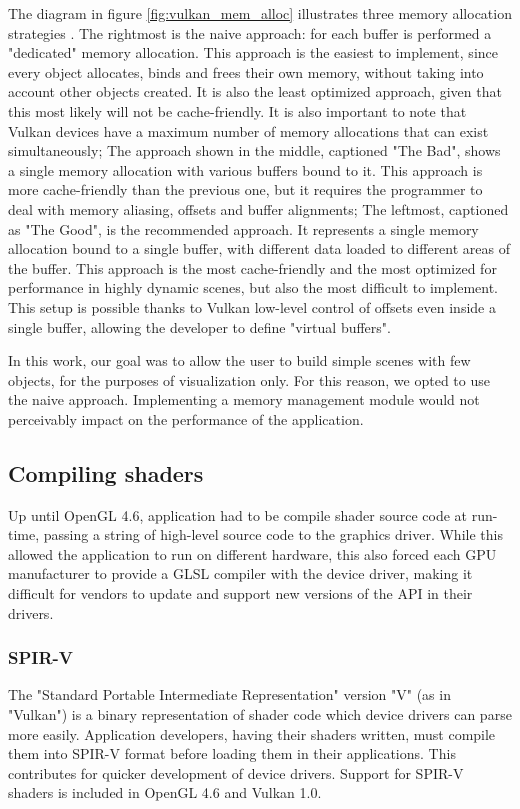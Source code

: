 The diagram in figure \ref{fig:vulkan_mem_alloc} illustrates three memory allocation strategies \cite{vulkan_mem_mgmt}.
The rightmost is the naive approach: for each buffer is performed a "dedicated" memory allocation. This approach is the easiest to implement, since every object allocates, binds and frees their own memory, without taking into account other objects created. It is also the least optimized approach, given that this most likely will not be cache-friendly. It is also important to note that Vulkan devices have a maximum number of memory allocations that can exist simultaneously;
The approach shown in the middle, captioned "The Bad", shows a single memory allocation with various buffers bound to it. This approach is more cache-friendly than the previous one, but it requires the programmer to deal with memory aliasing, offsets and buffer alignments;
The leftmost, captioned as "The Good", is the recommended approach. It represents a single memory allocation bound to a single buffer, with different data loaded to different areas of the buffer. This approach is the most cache-friendly and the most optimized for performance in highly dynamic scenes, but also the most difficult to implement. This setup is possible thanks to Vulkan low-level control of offsets even inside a single buffer, allowing the developer to define "virtual buffers".

In this work, our goal was to allow the user to build simple scenes with few objects, for the purposes of visualization only. For this reason, we opted to use the naive approach. Implementing a memory management module would not perceivably impact on the performance of the application.

\subsection{Compiling shaders}
Up until OpenGL 4.6, application had to be compile shader source code at run-time, passing a string of high-level source code to the graphics driver. While this allowed the application to run on different hardware, this also forced each GPU manufacturer to provide a GLSL compiler with the device driver, making it difficult for vendors to update and support new versions of the API in their drivers.

\subsubsection{SPIR-V}
The "Standard Portable Intermediate Representation" version "V" (as in "Vulkan") is a binary representation of shader code which device drivers can parse more easily. Application developers, having their shaders written, must compile them into SPIR-V format before loading them in their applications. This contributes for quicker development of device drivers. Support for SPIR-V shaders is included in OpenGL 4.6 and Vulkan 1.0.
